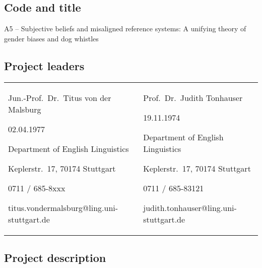 \documentclass[11pt]{article}
\begin{document}


\subsection{Code and title}

A5 -- Subjective beliefs and misaligned reference systems: A unifying theory of gender biases and dog whistles

\subsection{Project leaders}

\begin{tabular}{p{}p{}}
  Jun.-Prof.\ Dr.\ Titus von der Malsburg \par
  02.04.1977 \par
  Department of English Linguistics \par
  Keplerstr.\ 17, 70174 Stuttgart \par
  0711 / 685-8xxx \par
  titus.vondermalsburg@ling.uni-stuttgart.de
  & 
  Prof.\ Dr.\ Judith Tonhauser \par
  19.11.1974 \par
  Department of English Linguistics \par
  Keplerstr.\ 17, 70174 Stuttgart \par
  0711 / 685-83121 \par
  judith.tonhauser@ling.uni-stuttgart.de
\end{tabular}

\subsection{Project description}

\end{document}
